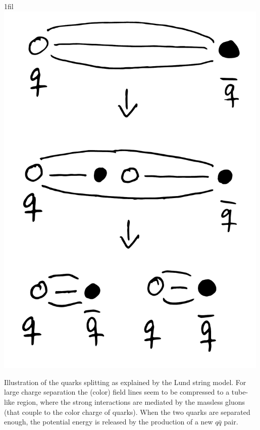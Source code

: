 \documentclass[a4paper, twoside, nobib]{tufte-book}
\makeatletter
\newcommand*{\centerfloat}{%
  \parindent \z@
  \leftskip \z@ \@plus 1fil \@minus \textwidth
  \rightskip\leftskip
  \parfillskip \z@skip}
\makeatother
\begin{document}
\begin{marginfigure}
  \centerfloat
  \includegraphics[width=0.99\textwidth]{figures/quark_splitting/quark_splitting.pdf}
  \caption[Quark Splitting]{Illustration of the quarks splitting as explained by the Lund string model. For large charge separation the (color) field lines seem to be compressed to a tube-like region, where the strong interactions are mediated by the massless gluons (that couple to the color charge of quarks). When the two quarks are separated enough, the potential energy is released by the production of a new $q\bar{q}$ pair.}
  \label{fig:hep:quark_splitting_strings}
\end{marginfigure}
\end{document}
